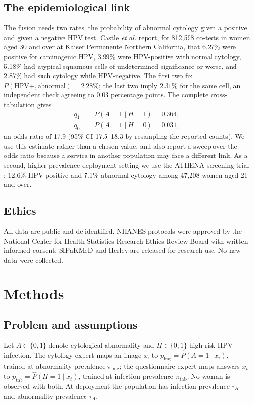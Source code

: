 \documentclass[lettersize,journal]{IEEEtran}
\newcommand{\pimg}{p_{\mathrm{img}}}
\newcommand{\ptab}{p_{\mathrm{tab}}}
\newcommand{\piimg}{\pi_{\mathrm{img}}}
\newcommand{\pitab}{\pi_{\mathrm{tab}}}
\begin{document}
\subsection{The epidemiological link}
\label{sec:link}
The fusion needs two rates: the probability of abnormal cytology given a positive and given a negative HPV test. Castle \emph{et al.} \cite{castle2009cotesting} report, for 812,598 co-tests in women aged 30 and over at Kaiser Permanente Northern California, that 6.27\% were positive for carcinogenic HPV, 3.99\% were HPV-positive with normal cytology, 5.18\% had atypical squamous cells of undetermined significance or worse, and 2.87\% had such cytology while HPV-negative. The first two fix $P(\text{HPV}+,\text{abnormal})=2.28\%$; the last two imply $2.31\%$ for the same cell, an independent check agreeing to 0.03 percentage points. The complete cross-tabulation gives
\[
\begin{aligned}
q_1 &= P(A{=}1\mid H{=}1) = 0.364,\\
q_0 &= P(A{=}1\mid H{=}0) = 0.031,
\end{aligned}
\]
an odds ratio of 17.9 (95\% CI 17.5--18.3 by resampling the reported counts). We use this estimate rather than a chosen value, and also report a sweep over the odds ratio because a service in another population may face a different link. As a second, higher-prevalence deployment setting we use the ATHENA screening trial \cite{wright2012athena}: 12.6\% HPV-positive and 7.1\% abnormal cytology among 47,208 women aged 21 and over.

\subsection{Ethics}
All data are public and de-identified. NHANES protocols were approved by the National Center for Health Statistics Research Ethics Review Board with written informed consent; SIPaKMeD and Herlev are released for research use. No new data were collected.

\section{Methods}

\subsection{Problem and assumptions}
\label{sec:assumptions}
Let $A\in\{0,1\}$ denote cytological abnormality and $H\in\{0,1\}$ high-risk HPV infection. The cytology expert maps an image $x_i$ to $\pimg=\hat P(A{=}1\mid x_i)$, trained at abnormality prevalence $\piimg$; the questionnaire expert maps answers $x_t$ to $\ptab=\hat P(H{=}1\mid x_t)$, trained at infection prevalence $\pitab$. No woman is observed with both. At deployment the population has infection prevalence $\tau_H$ and abnormality prevalence $\tau_A$.
\end{document}
